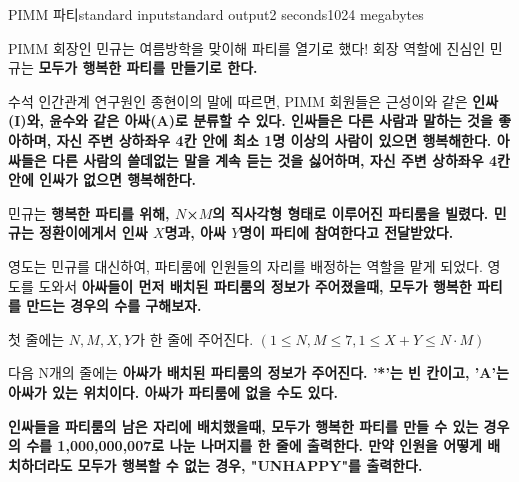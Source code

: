 \begin{problem}{PIMM 파티}{standard input}{standard output}{2 seconds}{1024 megabytes}

PIMM 회장인 민규는 여름방학을 맞이해 파티를 열기로 했다! 회장 역할에 진심인 민규는 \bf{모두가 행복한 파티}를 만들기로 한다.$$$$

수석 인간관계 연구원인 종현이의 말에 따르면, PIMM 회원들은 근성이와 같은 \bf{인싸(I)}와, 윤수와 같은 \bf{아싸(A)}로 분류할 수 있다. \bf{인싸}들은 다른 사람과 말하는 것을 좋아하며, \bf{자신 주변 상하좌우 4칸 안에 최소 1명 이상의 사람이 있으면 행복해한다.} \bf{아싸}들은 다른 사람의 쓸데없는 말을 계속 듣는 것을 싫어하며, \bf{자신 주변 상하좌우 4칸 안에 인싸가 없으면 행복해한다.}

민규는 \bf{행복한 파티}를 위해, $N$×$M$의 직사각형 형태로 이루어진 파티룸을 빌렸다. 민규는 정환이에게서 인싸 $X$명과, 아싸 $Y$명이 파티에 참여한다고 전달받았다.

영도는 민규를 대신하여, 파티룸에 인원들의 자리를 배정하는 역할을 맡게 되었다. 영도를 도와서 \bf{아싸들이 먼저 배치된 파티룸}의 정보가 주어졌을때, \bf{모두가 행복한 파티}를 만드는 경우의 수를 구해보자.

\InputFile
첫 줄에는 $N, M, X, Y$가 한 줄에 주어진다. $(1 \le N,M \le 7, 1 \le X+Y \le N \cdot M)$

다음 N개의 줄에는 \bf{아싸}가 배치된 파티룸의 정보가 주어진다. '*'는 빈 칸이고, 'A'는 \bf{아싸}가 있는 위치이다. \bf{아싸}가 파티룸에 없을 수도 있다.

\OutputFile
\bf{인싸}들을 파티룸의 남은 자리에 배치했을때, \bf{모두가 행복한 파티}를 만들 수 있는 경우의 수를 1,000,000,007로 나눈 나머지를 한 줄에 출력한다. 만약 인원을 어떻게 배치하더라도 모두가 행복할 수 없는 경우, "UNHAPPY"를 출력한다.

\Examples

\begin{example}
%
%
\end{example}

\end{problem}

